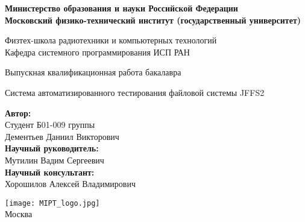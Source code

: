 \begin{center}
    \large\textbf{Министерство образования и науки Российской Федерации \\
    Московский физико-технический институт (государственный
    университет)} \\
    \vspace{1cm}

    Физтех-школа радиотехники и компьютерных технологий \\
    Кафедра системного программирования ИСП РАН 

    \vspace{3em}

    Выпускная квалификационная работа бакалавра
\end{center}

\begin{center}
    \vspace{\fill}
    \LARGE{Система автоматизированного тестирования файловой системы JFFS2}

    \vspace{\fill}
\end{center}


\begin{flushright}
    \textbf{Автор:} \\
    Студент Б01-009 группы \\
    Дементьев Даниил Викторович \\
    \vspace{2em}
    \textbf{Научный руководитель:} \\
    Мутилин Вадим Сергеевич \\
    \vspace{2em}
    \textbf{Научный консультант:} \\
    Хорошилов Алексей Владимирович \\
\end{flushright}

\vspace{7em}

\begin{center}
    \texttt{[image: MIPT\_logo.jpg]}\\
    Москва \the\year{}
\end{center}

\thispagestyle{empty}

\newpage
\setcounter{page}{2}
\fancyfoot[c]{\thepage}
\fancyhead[R]{}